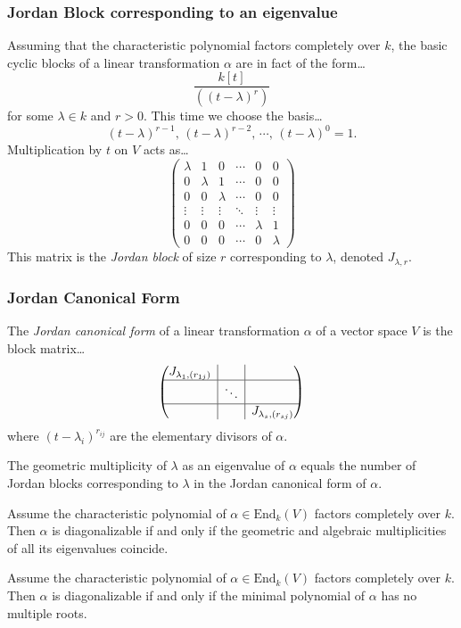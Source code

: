 \subsubsection{Jordan Block corresponding to an eigenvalue}\label{jordanblock}
Assuming that the characteristic polynomial factors completely over $k$, the basic cyclic blocks
of a linear transformation $\alpha$ are in fact of the form\dots
$$\frac{k[t]}{((t-\lambda)^r)}$$
for some $\lambda \in k$ and $r > 0$. This time we choose the basis\dots
$$(t-\lambda)^{r-1}, \, (t-\lambda)^{r-2}, \, \cdots, \, (t-\lambda)^0 = 1.$$
Multiplication by $t$ on $V$ acts as\dots
\[
\begin{pmatrix}
\lambda & 1 & 0 & \cdots & 0 & 0\\
0 & \lambda & 1 & \cdots & 0 & 0\\
0 & 0 & \lambda & \cdots & 0 & 0\\
\vdots & \vdots & \vdots & \ddots & \vdots & \vdots\\
0 & 0 & 0 & \cdots & \lambda & 1 \\
0 & 0 & 0 & \cdots & 0 & \lambda 
\end{pmatrix}
\]
This matrix is the \emph{Jordan block} of size $r$ corresponding to $\lambda$, denoted $J_{\lambda, r}$.

\subsubsection{Jordan Canonical Form}\label{jordancanonicalform}
The \emph{Jordan canonical form} of a linear transformation $\alpha$ of a vector space $V$ is the block matrix\dots
\[
\begin{pmatrix}
J_{\lambda_1,(r_{1j})} & \rvline & & \rvline & \\ \hline
& \rvline & \ddots & \rvline & \\ \hline
& \rvline & & \rvline & J_{\lambda_s,(r_{sj})}
\end{pmatrix}
\]
where $(t - \lambda_i)^{r_{ij}}$ are the elementary divisors of $\alpha$.

\begin{proposition}
The geometric multiplicity of $\lambda$ as an eigenvalue of $\alpha$ equals the number of Jordan blocks corresponding
to $\lambda$ in the Jordan canonical form of $\alpha$.
\end{proposition}

\begin{corollary}
Assume the characteristic polynomial of $\alpha \in \textrm{End}_k(V)$ factors completely over $k$. Then
$\alpha$ is diagonalizable if and only if the geometric and algebraic multiplicities of all its eigenvalues coincide.
\end{corollary}

\begin{proposition}
Assume the characteristic polynomial of $\alpha \in \textrm{End}_k(V)$ factors completely over $k$. Then $\alpha$ is
diagonalizable if and only if the minimal polynomial of $\alpha$ has no multiple roots.
\end{proposition}